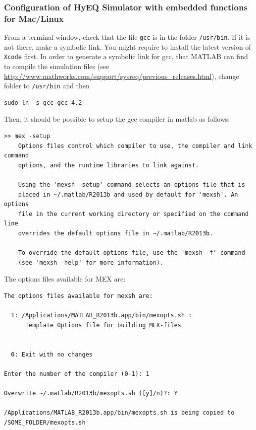 \documentclass{article}
\begin{document}
\subsubsection{Configuration of HyEQ Simulator with embedded functions for Mac/Linux}

From a terminal window, check that the file {\tt gcc} is in
the folder {\tt/usr/bin}.
If it is not there, make a symbolic link. 
You might require to install the latest version of {\tt Xcode} first.
In order to generate a symbolic link for gcc, that MATLAB can find to compile the simulation files (see \url{http://www.mathworks.com/support/sysreq/previous_releases.html}), change folder to {\tt /usr/bin} and then
\begin{verbatim}
sudo ln -s gcc gcc-4.2
\end{verbatim}
\noindent Then, it should be possible to setup the gcc compiler in matlab as follows:

\begin{verbatim}
>> mex -setup
    Options files control which compiler to use, the compiler and link command
    options, and the runtime libraries to link against.

    Using the 'mexsh -setup' command selects an options file that is
    placed in ~/.matlab/R2013b and used by default for 'mexsh'. An options 
    file in the current working directory or specified on the command line 
    overrides the default options file in ~/.matlab/R2013b.
 
    To override the default options file, use the 'mexsh -f' command
    (see 'mexsh -help' for more information).

\end{verbatim}

The options files available for MEX are:

\begin{verbatim}
The options files available for mexsh are:

  1: /Applications/MATLAB_R2013b.app/bin/mexopts.sh : 
      Template Options file for building MEX-files
 

  0: Exit with no changes

Enter the number of the compiler (0-1): 1

Overwrite ~/.matlab/R2013b/mexopts.sh ([y]/n)?: Y

/Applications/MATLAB_R2013b.app/bin/mexopts.sh is being copied to 
/SOME_FOLDER/mexopts.sh

\end{verbatim}
\end{document}

